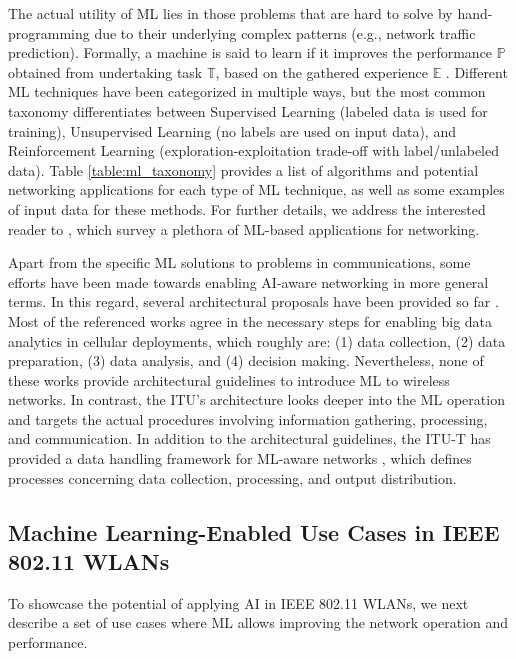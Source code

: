 \documentclass[journal]{IEEEtran}
\begin{document}
The actual utility of ML lies in those problems that are hard to solve by hand-programming due to their underlying complex patterns (e.g., network traffic prediction). Formally, a machine is said to learn if it improves the performance $\mathbb{P}$ obtained from undertaking task $\mathbb{T}$, based on the gathered experience $\mathbb{E}$ \cite{mitchell1997machine}. Different ML techniques have been categorized in multiple ways, but the most common taxonomy differentiates between Supervised Learning (labeled data is used for training), Unsupervised Learning (no labels are used on input data), and Reinforcement Learning (exploration-exploitation trade-off with label/unlabeled data). Table \ref{table:ml_taxonomy} provides a list of algorithms and potential networking applications for each type of ML technique, as well as some examples of input data for these methods. For further details, we address the interested reader to \cite{jiang2016machine, zhang2019deep, usama2019unsupervised}, which survey a plethora of ML-based applications for networking.

Apart from the specific ML solutions to problems in communications, some efforts have been made towards enabling AI-aware networking in more general terms. In this regard, several architectural proposals have been provided so far \cite{bi2015wireless,chih2017big,wang2018machine}. Most of the referenced works agree in the necessary steps for enabling big data analytics in cellular deployments, which roughly are: (1) data collection, (2) data preparation, (3) data analysis, and (4) decision making. Nevertheless, none of these works provide architectural guidelines to introduce ML to wireless networks. In contrast, the ITU's architecture looks deeper into the ML operation and targets the actual procedures involving information gathering, processing, and communication. In addition to the architectural guidelines, the ITU-T has provided a data handling framework for ML-aware networks \cite{itu2019data}, which defines processes concerning data collection, processing, and output distribution. 

\subsection{Machine Learning-Enabled Use Cases in IEEE 802.11 WLANs}
To showcase the potential of applying AI in IEEE 802.11 WLANs, we next describe a set of use cases where ML allows improving the network operation and performance.
\end{document}
